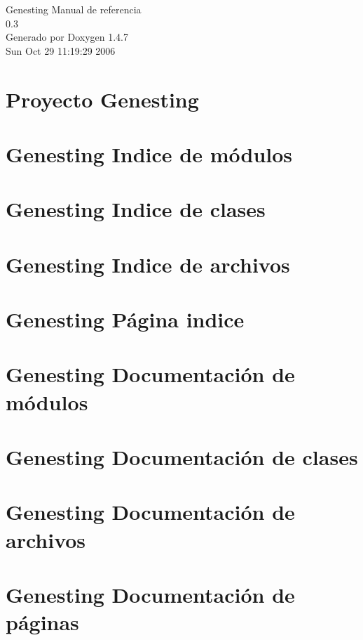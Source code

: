 \documentclass[letterpaper]{book}
\begin{document}
\begin{titlepage}
\vspace*{7cm}
\begin{center}
{\Large Genesting Manual de referencia\\[1ex]\large 0.3 }\\
\vspace*{1cm}
{\large Generado por Doxygen 1.4.7}\\
\vspace*{0.5cm}
{\small Sun Oct 29 11:19:29 2006}\\
\end{center}
\end{titlepage}
\clearemptydoublepage
{}
\tableofcontents
\clearemptydoublepage
{}
\chapter{Proyecto Genesting }
\label{index}\hypertarget{index}{}
\chapter{Genesting Indice de m\'{o}dulos}

\chapter{Genesting Indice de clases}

\chapter{Genesting Indice de archivos}

\chapter{Genesting P\'{a}gina indice}

\chapter{Genesting Documentaci\'{o}n de m\'{o}dulos}



\chapter{Genesting Documentaci\'{o}n de clases}








\chapter{Genesting Documentaci\'{o}n de archivos}



















\chapter{Genesting Documentaci\'{o}n de p\'{a}ginas}


\printindex
\end{document}
